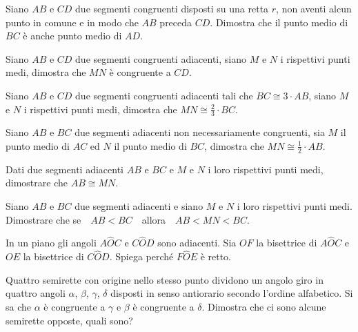 \begin{multicols}{2}
\begin{esercizio}
Siano \(AB\) e \(CD\) due segmenti congruenti disposti su una retta \(r\), 
non aventi alcun punto in comune e in modo che \(AB\) preceda \(CD\). 
Dimostra che il punto medio di \(BC\) è anche punto medio di \(AD\).
\end{esercizio}

\begin{esercizio}
Siano \(AB\) e \(CD\) due segmenti congruenti adiacenti, siano \(M\) e \(N\) 
i rispettivi punti medi, dimostra che \(MN\) è congruente a \(CD\).
\end{esercizio}

\begin{esercizio}
Siano \(AB\) e \(CD\) due segmenti congruenti adiacenti tali che \(BC\cong 
3\cdot AB\), siano \(M\) e \(N\) i rispettivi punti medi, dimostra che 
\(MN\cong \frac{2}{3}\cdot BC\).
\end{esercizio}

\begin{esercizio}
Siano \(AB\) e \(BC\) due segmenti adiacenti non necessariamente 
congruenti, sia \(M\) il punto medio di \(AC\) ed \(N\) il punto medio di 
\(BC\), dimostra che \(MN\cong \frac{1}{2}\cdot AB\).
\end{esercizio}

\begin{esercizio}
Dati due segmenti adiacenti \(AB\) e \(BC\) e \(M\) e \(N\) i loro rispettivi 
punti medi, dimostrare che \(AB\cong MN\).
\end{esercizio}

\begin{esercizio}
Siano \(AB\) e \(BC\) due segmenti adiacenti e siano \(M\) e \(N\) i loro 
rispettivi punti medi. Dimostrare che se~~\(AB < BC\)~~allora~~\(AB < MN 
< BC\).
\end{esercizio}
 
\begin{esercizio}
In un piano gli angoli \(A\widehat{O}C\) e \(C\widehat{O}D\) sono 
adiacenti. Sia \(OF\) la bisettrice di \(A\widehat{O}C\) e \(OE\) la 
bisettrice di \(C\widehat{O}D\). Spiega perché \(F\widehat{O}E\) è retto.
\end{esercizio}

\begin{esercizio}
Quattro semirette con origine nello stesso punto dividono un angolo 
giro in quattro angoli \(\alpha\), \(\beta\), \(\gamma\), \(\delta\) disposti 
in senso antiorario secondo l'ordine alfabetico. Si sa che \(\alpha\) è 
congruente a \(\gamma\) e \(\beta\) è congruente a \(\delta\). Dimostra che 
ci sono alcune semirette opposte, quali sono?
\end{esercizio}


\end{multicols}
